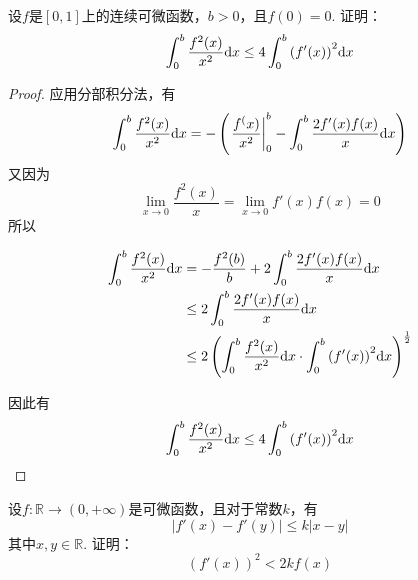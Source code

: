 \begin{proposition}

    设$f$是$[0, 1]$上的连续可微函数，$b > 0$，且$f(0) = 0$. 证明：
    \[\int_{0}^{b}{\dfrac{f^2(x)}{x^2}}\mathrm{d} x \leq 4\int_{0}^{b}{\left( f'(x) \right)^2 }\mathrm{d} x \]

\end{proposition}

\begin{proof}

    应用分部积分法，有
    \[\int_{0}^{b}{\dfrac{f^2(x)}{x^2}}\mathrm{d} x = - \left( \left. \dfrac{f^(x)}{x^2} \right|_{0}^{b} - \int_{0}^{b}{\dfrac{2f'(x)f(x)}{x}}\mathrm{d} x \right)\]
    又因为
    \[\lim\limits_{x \to 0}{\dfrac{f^2(x)}{x}} = \lim\limits_{x \to 0}{f'(x)f(x)} = 0\]
    所以

    \begin{align*}
        \int_{0}^{b}{\dfrac{f^2(x)}{x^2}}\mathrm{d} x & = -\dfrac{f^2(b)}{b} + 2 \int_{0}^{b}{\dfrac{2f'(x)f(x)}{x}}\mathrm{d} x \\
        & \leq 2\int_{0}^{b}{\dfrac{2f'(x)f(x)}{x}}\mathrm{d} x \\
        & \leq 2\left( \int_{0}^{b}{\dfrac{f^2(x)}{x^2}}\mathrm{d} x \cdot \int_{0}^{b}{\left( f'(x) \right)^2}\mathrm{d} x \right)^{\frac{1}{2}}
    \end{align*}

    因此有
    \[\int_{0}^{b}{\dfrac{f^2(x)}{x^2}}\mathrm{d} x \leq 4\int_{0}^{b}{\left( f'(x) \right)^2 }\mathrm{d} x \]

\end{proof}

\begin{proposition}

    设$f:\mathbb{R} \to (0 ,+\infty)$是可微函数，且对于常数$k$，有
    \[|f'(x) - f'(y)| \leq k|x - y|\]
    其中$x, y \in \mathbb{R}$. 证明：
    \[\left( f'(x) \right)^2 < 2kf(x)\]

\end{proposition}


